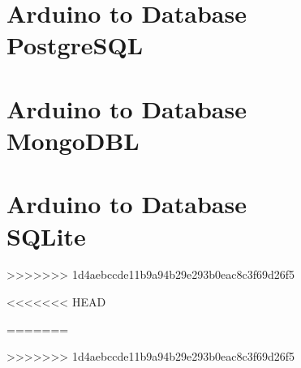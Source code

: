 \documentclass{wileySix}
\begin{document}
\chapter[PostgreSQL]
{Arduino to Database\\ PostgreSQL}


\chapter[MongoDB]
{Arduino to Database\\ MongoDBL}


\chapter[SQLite]
{Arduino to Database\\ SQLite}



%
>>>>>>> 1d4aebccde11b9a94b29e293b0eac8c3f69d26f5

%

%

%

%





<<<<<<< HEAD

=======

>>>>>>> 1d4aebccde11b9a94b29e293b0eac8c3f69d26f5

\printindex
\end{document}
